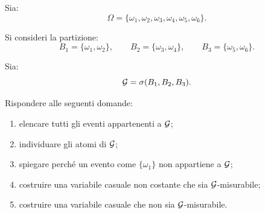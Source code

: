 \begin{exercise}
\label{ex:cap3-prop-sigma-partizione}

Sia:
\[
\Omega
=
\{\omega_1,\omega_2,\omega_3,\omega_4,\omega_5,\omega_6\}.
\]

Si consideri la partizione:
\[
B_1=\{\omega_1,\omega_2\},
\qquad
B_2=\{\omega_3,\omega_4\},
\qquad
B_3=\{\omega_5,\omega_6\}.
\]

Sia:
\[
\mathcal{G}
=
\sigma(B_1,B_2,B_3).
\]

Rispondere alle seguenti domande:

\begin{enumerate}
    \item elencare tutti gli eventi appartenenti a $\mathcal{G}$;

    \item individuare gli atomi di $\mathcal{G}$;

    \item spiegare perch\'{e} un evento come $\{\omega_1\}$ non appartiene a
    $\mathcal{G}$;

    \item costruire una variabile casuale non costante che sia
    $\mathcal{G}$-misurabile;

    \item costruire una variabile casuale che non sia $\mathcal{G}$-misurabile.
\end{enumerate}

\end{exercise}

